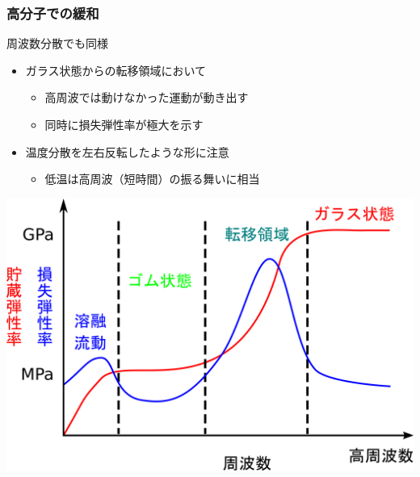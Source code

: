 \documentclass[unicode,12pt]{beamer}%
\begin{document}
\begin{frame}
    \frametitle{高分子での緩和}
			\begin{block}{周波数分散でも同様}
				\begin{itemize}
					\item ガラス状態からの転移領域において
					\begin{itemize}
						\item 高周波では動けなかった運動が動き出す
						\item 同時に損失弾性率が極大を示す
					\end{itemize}
					\item \alert{温度分散を左右反転したような形に注意}
					\begin{itemize}
                        \item 低温は高周波（短時間）の振る舞いに相当
                    \end{itemize}
				\end{itemize}

				\vspace{2mm}
				\centering
				\includegraphics[width=.45\textwidth]{dynamic_ViscoElast_Freq.png}
			\end{block}
			
\end{frame}
\end{document}
